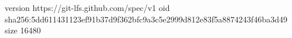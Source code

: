version https://git-lfs.github.com/spec/v1
oid sha256:5dd611431123ef91b37d9f362bfc9a3c5e2999d812e83f5a8874243f46ba3d49
size 16480
